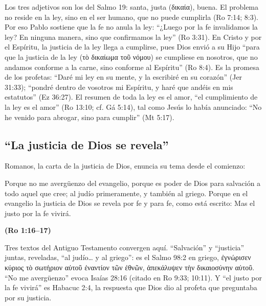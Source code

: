 \documentclass[11pt,letterpaper]{article}
\newcommand{\grc}[1]{\foreignlanguage{ancientgreek}{#1}}
\newcommand{\fuente}[1]{\par\hfill{\upshape\bfseries\small\textcolor{azul}{#1}}}
\begin{document}
Los tres adjetivos son los del Salmo 19: santa, justa (\grc{δικαία}), buena. El problema no reside en la ley, sino en el ser humano, que no puede cumplirla (Ro 7:14; 8:3). Por eso Pablo sostiene que la fe no anula la ley: ``¿Luego por la fe invalidamos la ley? En ninguna manera, sino que confirmamos la ley'' (Ro 3:31). En Cristo y por el Espíritu, la justicia de la ley llega a cumplirse, pues Dios envió a su Hijo ``para que la justicia de la ley (\grc{τὸ δικαίωμα τοῦ νόμου}) se cumpliese en nosotros, que no andamos conforme a la carne, sino conforme al Espíritu'' (Ro 8:4). Es la promesa de los profetas: ``Daré mi ley en su mente, y la escribiré en su corazón'' (Jer 31:33); ``pondré dentro de vosotros mi Espíritu, y haré que andéis en mis estatutos'' (Ez 36:27). El resumen de toda la ley es el amor, ``el cumplimiento de la ley es el amor'' (Ro 13:10; cf. Gá 5:14), tal como Jesús lo había anunciado: ``No he venido para abrogar, sino para cumplir'' (Mt 5:17).

\subsection{``La justicia de Dios se revela''}
Romanos, la carta de la justicia de Dios, enuncia su tema desde el comienzo:

\begin{cita}Porque no me avergüenzo del evangelio, porque es poder de Dios para salvación a todo aquel que cree; al judío primeramente, y también al griego. Porque en el evangelio la justicia de Dios se revela por fe y para fe, como está escrito: Mas el justo por la fe vivirá.\fuente{(Ro 1:16--17)}\end{cita}

Tres textos del Antiguo Testamento convergen aquí. ``Salvación'' y ``justicia'' juntas, reveladas, ``al judío\ldots{} y al griego'': es el Salmo 98:2 en griego, \grc{ἐγνώρισεν κύριος τὸ σωτήριον αὐτοῦ ἐναντίον τῶν ἐθνῶν, ἀπεκάλυψεν τὴν δικαιοσύνην αὐτοῦ}. ``No me avergüenzo'' evoca Isaías 28:16 (citado en Ro 9:33; 10:11). Y ``el justo por la fe vivirá'' es Habacuc 2:4, la respuesta que Dios dio al profeta que preguntaba por su justicia.
\end{document}
